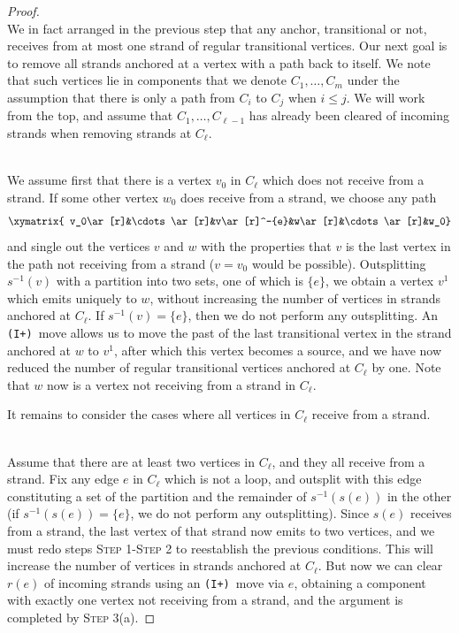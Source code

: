 \documentclass[12pt]{amsbook}%
\theoremstyle{defin}
\theoremstyle{remark}
\numberwithin{equation}{chapter}
\numberwithin{theor}{section}
\newcommand{\IIIp}{\mbox{\texttt{\textup{(I+)}}}}
\newcommand{\step}[1]{\mbox{}\\\noindent{\textsc{Step} #1:}}
\newcommand{\substep}[2]{\mbox{}\\\noindent{\textsc{Step} #1(#2):}}
\newcommand{\mystep}[1]{{\textsc{Step}} #1}
\newcommand{\mysubstep}[2]{{\textsc{Step}} #1(#2)}
\begin{document}
\begin{proof}
\step{3} We in fact arranged in the previous step that any anchor, transitional or not, receives from at most one strand of regular transitional vertices. Our next goal is to remove all strands anchored at a vertex with a path back to itself. We note that such vertices lie in components that we denote $C_1,\dots,C_m$ under the assumption that there is only a path from $C_i$ to $C_j$ when $i\leq j$. We will work from the top, and assume that $C_1,\dots,C_{\ell-1}$ has already been cleared of incoming strands when removing strands at $C_\ell$.

\substep{3}{a}
We assume first that there is a vertex $v_0$ in $C_\ell$ which does not receive from a strand. If some other vertex $w_0$ does receive from a strand, we choose any path
\[
\xymatrix{
v_0\ar[r]&\cdots\ar[r]&v\ar[r]^-{e}&w\ar[r]&\cdots\ar[r]&w_0}
\]
and single out the vertices $v$ and $w$ with the properties that $v$ is the last vertex in the path not receiving from a strand ($v=v_0$ would be  possible). Outsplitting $s^{-1}(v)$ with a partition into two sets, one of which is $\{e\}$, we obtain a vertex $v^1$ which emits uniquely to $w$, without increasing the number of vertices in strands anchored at $C_\ell$.  If $s^{-1}(v)= \{e\}$, then we do not perform any outsplitting.  An \IIIp\ move allows us to move the past of the last transitional vertex in the strand anchored at $w$ to $v^1$, after which this vertex becomes a source, and we have now reduced the number of regular transitional vertices anchored at $C_\ell$ by one. Note that $w$ now is a vertex not receiving from a strand in $C_\ell$.

It remains to consider the cases where all vertices in $C_\ell$ receive from a strand. 

\substep{3}{b}
Assume that there are at least two vertices in $C_\ell$, and they all receive from a strand. Fix any edge $e$ in $C_\ell$ which is not a loop, and outsplit with this edge constituting a set of the partition and the remainder of $s^{-1}(s(e))$ in the other (if $s^{-1}(s(e)) = \{e\}$, we do not perform any outsplitting).  Since $s(e)$ receives from a strand, the last vertex of that strand now emits to two vertices, and we must redo steps \mystep{1}-\mystep{2} to reestablish the previous conditions. This will increase the number of vertices in strands anchored at $C_\ell$. But now we can clear $r(e)$ of incoming strands using an \IIIp \ move via $e$, obtaining a component with exactly one vertex not receiving from a strand, and the argument is completed by \mysubstep{3}{a}.  


\end{proof}
\end{document}
